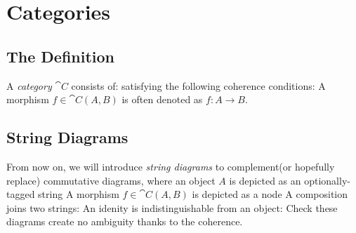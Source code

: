 
\section{Categories}

\subsection{The Definition}

\begin{definition}[Category]
A \emph{category} $\cat{C}$ consists of:
satisfying the following coherence conditions:
A morphism $f \in \cat{C}(A,B)$ is often denoted as
$
    f : A \to B
$.
\end{definition}

\subsection{String Diagrams}

From now on, we will introduce \emph{string diagrams} %
to complement(or hopefully replace) commutative diagrams, where an object $A$ %
is depicted as an optionally-tagged string
A morphism $f \in \cat{C}(A,B)$ is depicted as a node
A composition joins two strings:
An idenity is indistinguishable from an object:
Check these diagrams create no ambiguity thanks to the coherence.


